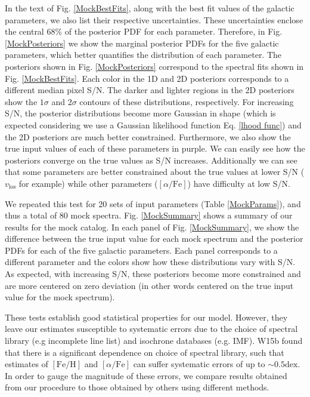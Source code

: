 \documentclass[twocolumn]{aastex6}
\def\feh{\mathrm{[Fe/H]}}
\def\afe{[\alpha/\mathrm{Fe}]}
\def\dex{\mathrm{dex}}
\def\vlos{v_\mathrm{los}}
\begin{document}
In the text of Fig. \ref{MockBestFits}, along with the best fit values of the galactic parameters, we also list their respective uncertainties.
These uncertainties enclose the central 68\% of the posterior PDF for each parameter.
Therefore, in Fig. \ref{MockPosteriors} we show the marginal posterior PDFs for the five galactic parameters, which better quantifies the distribution of each parameter.
The posteriors shown in Fig. \ref{MockPosteriors} correspond to the spectral fits shown in Fig. \ref{MockBestFits}.
Each color in the 1D and 2D posteriors corresponds to a different median pixel S/N.
The darker and lighter regions in the 2D posteriors show the $1\sigma$ and $2\sigma$ contours of these distributions, respectively.
For increasing S/N, the posterior distributions become more Gaussian in shape (which is expected considering we use a Gaussian likelihood function Eq. \ref{lhood func}) and the 2D posteriors are much better constrained.
Furthermore, we also show the true input values of each of these parameters in purple.
We can easily see how the posteriors converge on the true values as S/N increases.
Additionally we can see that some parameters are better constrained about the true values at lower S/N ($\vlos$ for example) while other parameters ($\afe$) have difficulty at low S/N.

We repeated this test for 20 sets of input parameters (Table \ref{MockParams}), and thus a total of 80 mock spectra.
Fig. \ref{MockSummary} shows a summary of our results for the mock catalog.
In each panel of Fig. \ref{MockSummary}, we show the difference between the true input value for each mock spectrum and the posterior PDFs for each of the five galactic parameters.
Each panel corresponds to a different parameter and the colors show how these distributions vary with S/N.
As expected, with increasing S/N, these posteriors become more constrained and are more centered on zero deviation (in other words centered on the true input value for the mock spectrum).

These tests establish good statistical properties for our model.
However, they leave our estimates susceptible to systematic errors due to the choice of spectral library (e.g incomplete line list) and isochrone databases (e.g. IMF).
W15b found that there is a significant dependence on choice of spectral library, such that estimates of $\feh$ and $\afe$ can suffer systematic errors of up to $\sim0.5\dex$.
In order to gauge the magnitude of these errors, we compare results obtained from our procedure to those obtained by others using different methods.
\end{document}
